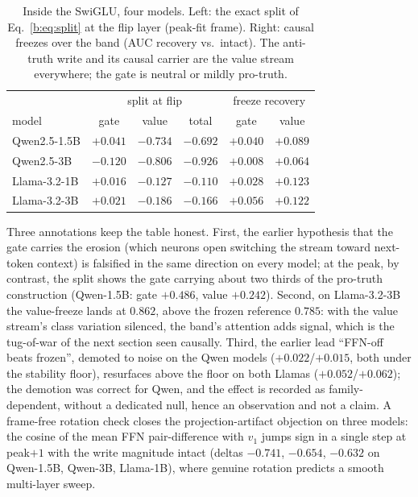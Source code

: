 \documentclass[11pt]{article}
\begin{document}
\begin{table}[H]
\centering
\caption{Inside the SwiGLU, four models. Left: the exact split of
Eq.~\ref{b:eq:split} at the flip layer (peak-fit frame). Right: causal
freezes over the band (AUC recovery vs.\ intact). The anti-truth write and
its causal carrier are the value stream everywhere; the gate is neutral or
mildly pro-truth.}
\label{b:tab:swiglu}
\begin{tabular}{lccccc}
\toprule
 & \multicolumn{3}{c}{split at flip} & \multicolumn{2}{c}{freeze recovery} \\
model & gate & value & total & gate & value \\
\midrule
Qwen2.5-1.5B & $+0.041$ & $-0.734$ & $-0.692$ & $+0.040$ & $+0.089$ \\
Qwen2.5-3B   & $-0.120$ & $-0.806$ & $-0.926$ & $+0.008$ & $+0.064$ \\
Llama-3.2-1B & $+0.016$ & $-0.127$ & $-0.110$ & $+0.028$ & $+0.123$ \\
Llama-3.2-3B & $+0.021$ & $-0.186$ & $-0.166$ & $+0.056$ & $+0.122$ \\
\bottomrule
\end{tabular}
\end{table}

Three annotations keep the table honest. First, the earlier hypothesis that
the gate carries the erosion (which neurons open switching the stream
toward next-token context) is falsified in the same direction on every
model; at the peak, by contrast, the split shows the gate carrying about
two thirds of the pro-truth construction (Qwen-1.5B: gate $+0.486$, value
$+0.242$). Second, on Llama-3.2-3B the value-freeze lands at $0.862$, above
the frozen reference $0.785$: with the value stream's class variation
silenced, the band's attention adds signal, which is the tug-of-war of the
next section seen causally. Third, the earlier lead ``FFN-off beats
frozen'', demoted to noise on the Qwen models ($+0.022$/$+0.015$, both
under the stability floor), resurfaces above the floor on both Llamas
($+0.052$/$+0.062$); the demotion was correct for Qwen, and the effect is
recorded as family-dependent, without a dedicated null, hence an
observation and not a claim. A frame-free rotation check closes the
projection-artifact objection on three models: the cosine of the mean FFN
pair-difference with $v_1$ jumps sign in a single step at peak$+1$ with the
write magnitude intact (deltas $-0.741$, $-0.654$, $-0.632$ on Qwen-1.5B,
Qwen-3B, Llama-1B), where genuine rotation predicts a smooth multi-layer
sweep.
\end{document}
